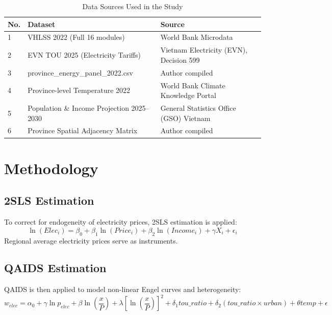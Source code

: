 \documentclass[12pt,a4paper]{article}
\begin{document}
	\begin{table}[H] 
		\centering
		\caption{Data Sources Used in the Study}
		\label{tab:data_sources}
		\begin{tabular}{lll}
			\toprule
			No. & Dataset & Source \\
			\midrule
			1 & VHLSS 2022 (Full 16 modules) & World Bank Microdata \\
			2 & EVN TOU 2025 (Electricity Tariffs) & Vietnam Electricity (EVN), Decision 599 \\
			3 & province\_energy\_panel\_2022.csv & Author compiled \\
			4 & Province-level Temperature 2022 & World Bank Climate Knowledge Portal \\
			5 & Population \& Income Projection 2025--2030 & General Statistics Office (GSO) Vietnam \\
			6 & Province Spatial Adjacency Matrix & Author compiled \\
			\bottomrule
		\end{tabular}
	\end{table}
			
	\section{Methodology}
	\subsection{2SLS Estimation}
	To correct for endogeneity of electricity prices, 2SLS estimation is applied:
	\[
	\ln(Elec_i) = \beta_0 + \beta_1 \ln(Price_i) + \beta_2 \ln(Income_i) + \gamma X_i + \epsilon_i
	\]
	Regional average electricity prices serve as instruments.
	
	\subsection{QAIDS Estimation}
	QAIDS is then applied to model non-linear Engel curves and heterogeneity:
	\[
	w_{elec} = \alpha_0 + \gamma \ln p_{elec} + \beta \ln\left(\frac{x}{P}\right) + \lambda \left[\ln\left(\frac{x}{P}\right)\right]^2 + \delta_1 tou\_ratio + \delta_2 (tou\_ratio \times urban) + \theta temp + \epsilon
	\]
	
\end{document}
